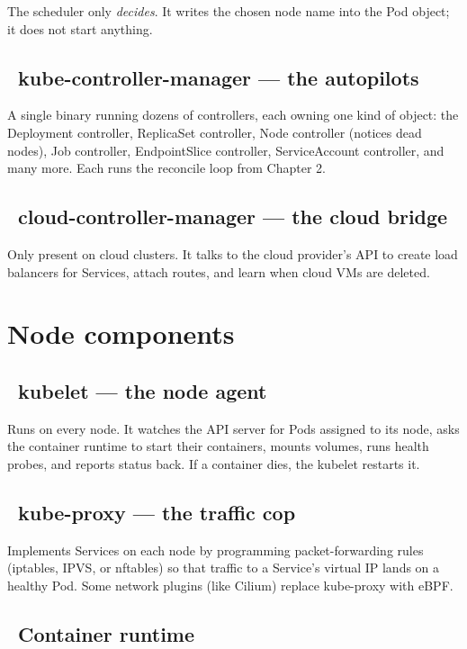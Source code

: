 The scheduler only \emph{decides}. It writes the chosen node name into the Pod
object; it does not start anything.

\subsection{\ kube-controller-manager --- the autopilots}

A single binary running dozens of controllers, each owning one kind of object:
the Deployment controller, ReplicaSet controller, Node controller (notices dead
nodes), Job controller, EndpointSlice controller, ServiceAccount controller,
and many more. Each runs the reconcile loop from Chapter 2.

\subsection{\ cloud-controller-manager --- the cloud bridge}

Only present on cloud clusters. It talks to the cloud provider's API to create
load balancers for Services, attach routes, and learn when cloud VMs are deleted.

\section{Node components}

\subsection{\ kubelet --- the node agent}

Runs on every node. It watches the API server for Pods assigned to its node,
asks the container runtime to start their containers, mounts volumes, runs
health probes, and reports status back. If a container dies, the kubelet
restarts it.

\subsection{\ kube-proxy --- the traffic cop}

Implements Services on each node by programming packet-forwarding rules
(iptables, IPVS, or nftables) so that traffic to a Service's virtual IP lands on
a healthy Pod. Some network plugins (like Cilium) replace kube-proxy with eBPF.

\subsection{\ Container runtime}

